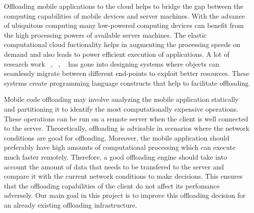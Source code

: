 Offloading mobile applications to the cloud helps to bridge the gap between the computing capabilities
of mobile devices and server machines. With the advance of ubiquitous computing many low-powered computing
devices can benefit from the high processing powers of available server machines. The elastic computational
cloud fuctionality helps in augmenting the processing speeds on demand and also leads to power efficient execution
of applications. A lot of research work ~\cite{netobj}, ~\cite{emerald}, ~\cite{tcl} has gone into designing systems where
objects can seamlessly migrate between different end-points to exploit better resources. These systems create
programming language constructs that help to facilitate offloading.

Mobile code offloading may involve analyzing the mobile application statically and partitioning it to identify the
most computationally expensive operations. These operations can be run on a remote server when the client is well
connected to the server. Theoretically, offloading is advisable in scenarios where the network conditions are good
for offloading. Moreover, the mobile application should preferably have high amounts of computational processing
which can execute much faster remotely. Therefore, a good offloading engine should take into account the amount of data that
needs to be transfered to the server and compare it with the current network conditions to make decisions.
This ensures that the offloading capabilities of the client do not affect its perfomance adversely. 
Our main goal in this project is to improve this offloading decision for an already existing offloading infrastructure.

